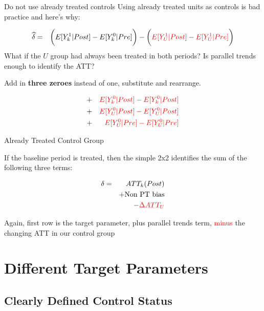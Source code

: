 \documentclass{beamer}
\begin{document}
\begin{frame}{Do not use already treated controls}
Using already treated units as controls is bad practice and here's why:

\begin{eqnarray*}
\widehat{\delta} &=& \bigg ( E[Y^1_k|Post] - E[Y^0_k|Pre] \bigg ) - \bigg ( \textcolor{red}{E[Y^1_U | Post ]} - \textcolor{red}{E[ Y^1_U | Pre]} \bigg) \\
\end{eqnarray*}What if the $U$ group had always been treated in both periods? Is parallel trends enough to identify the ATT?

\bigskip

Add in \textbf{three zeroes} instead of one, substitute and rearrange.

\begin{eqnarray*}
&+& \textcolor{red}{E[Y^0_k|Post] - E[Y^0_k|Post]} \\
&+& \textcolor{red}{E[Y^0_U|Post] - E[Y^0_U|Post]}  \\
&+& \textcolor{red}{E[Y^0_U|Pre] - E[Y^0_U|Pre]}
\end{eqnarray*}

\end{frame}

\begin{frame}{Already Treated Control Group}

If the baseline period is treated, then the simple 2x2 identifies the sum of the following three terms:

\begin{eqnarray*}
\delta &=& ATT_k(Post) \\&&+ \text{Non PT bias} \\&&- \textcolor{red}{\Delta ATT_U}
\end{eqnarray*}

Again, first row is the target parameter, plus parallel trends term, \textcolor{red}{minus} the changing ATT in our control group

\end{frame}

\section{Different Target Parameters}

\subsection{Clearly Defined Control Status}
\end{document}
